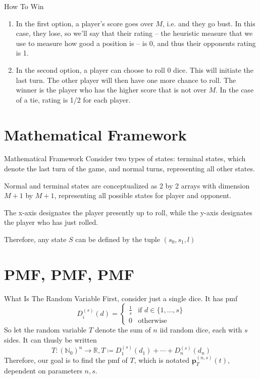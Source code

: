 \documentclass{beamer}
\begin{document}
\begin{frame}{How To Win}
    \begin{enumerate}
        \item In the first option, a player's score goes over $M$, i.e. and they go bust. In this case, they lose, so we'll say that their rating -- the heuristic measure that we use to measure how good a position is -- is 0, and thus their opponents rating is 1.
        \item In the second option, a player can choose to roll 0 dice. This will initiate the last turn. The other player will then have one more chance to roll. The winner is the player who has the higher score that is not over $M$. In the case of a tie, rating is 1/2 for each player.
    \end{enumerate}
\end{frame}

\section{Mathematical Framework}
\begin{frame}{Mathematical Framework}
    Consider two types of states: terminal states, which denote the last turn of the game, and normal turns, representing all other states.

    Normal and terminal states are conceptualized as 2 by 2 arrays with dimension $M+1$ by $M+1$, representing all possible states for player and opponent.

    The x-axis designates the player presently up to roll, while the y-axis designates the player who has just rolled.

    Therefore, any state $S$ can be defined by the tuple $(s_0, s_1, l)$
\end{frame}

\section{PMF, PMF, PMF}
\begin{frame}{What Is The Random Variable}
    First, consider just a single dice. It has pmf
    $$
    D_{i}^{(s)}(d) = \begin{cases}
        \frac{1}{s} & \text{if } d \in \{1, \ldots, s \} \\
        0 & \text{otherwise}
    \end{cases}
    $$
    So let the random variable $T$ denote the sum of $n$ iid random dice, each with $s$ sides. It can thusly be written
    $$
    T: \left(\mathbb{N}_{0}\right)^n \to \mathbb{R}, T \coloneqq D_{1}^{(s)}(d_1) + \cdots + D_{n}^{(s)}(d_n)
    $$
    Therefore, our goal is to find the pmf of $T$, which is notated $\textbf{p}_{T}^{(n, s)}(t)$, dependent on parameters $n, s$.
\end{frame}
\end{document}
